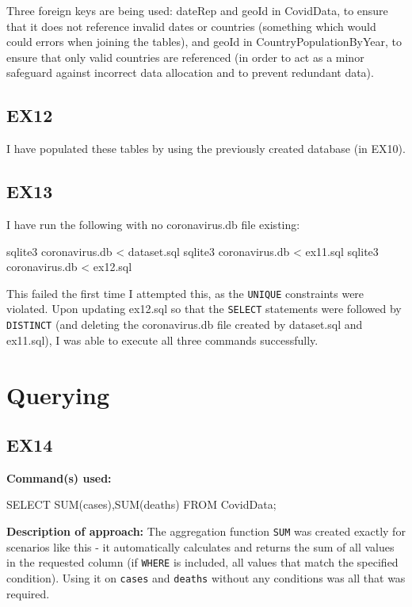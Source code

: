 \documentclass{article}
\begin{document}
Three foreign keys are being used: dateRep and geoId in CovidData, to ensure that it does not reference invalid dates or countries (something which would could errors when joining the tables), and geoId in CountryPopulationByYear, to ensure that only valid countries are referenced (in order to act as a minor safeguard against incorrect data allocation and to prevent redundant data).

\subsection{EX12}

I have populated these tables by using the previously created database (in EX10). 

\subsection{EX13}

I have run the following with no coronavirus.db file existing:

\begin{spverbatim}
sqlite3 coronavirus.db < dataset.sql
sqlite3 coronavirus.db < ex11.sql
sqlite3 coronavirus.db < ex12.sql
\end{spverbatim}

This failed the first time I attempted this, as the \verb|UNIQUE| constraints were violated. Upon updating ex12.sql so that the \verb|SELECT| statements were followed by \verb|DISTINCT| (and deleting the coronavirus.db file created by dataset.sql and ex11.sql), I was able to execute all three commands successfully.

\newpage
\section{Querying}

\subsection{EX14}

\textbf{Command(s) used:}
\begin{spverbatim}
SELECT SUM(cases),SUM(deaths)
FROM CovidData;
\end{spverbatim}

\textbf{Description of approach:}
The aggregation function \verb|SUM| was created exactly for scenarios like this - it automatically calculates and returns the sum of all values in the requested column (if \verb|WHERE| is included, all values that match the specified condition). Using it on \verb|cases| and \verb|deaths| without any conditions was all that was required.
\end{document}
